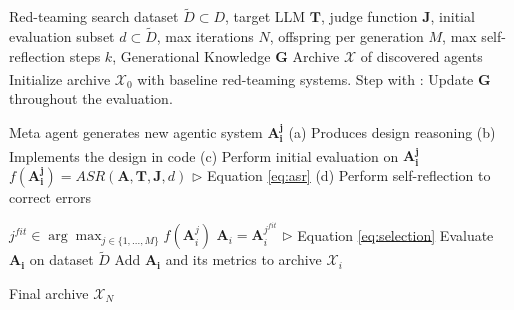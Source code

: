 \begin{algorithm}
\begin{algorithmic}[1]

     Red-teaming search dataset $\tilde D \subset D$, target LLM $\mathbf{T}$, judge function $\textbf{J}$, initial evaluation subset $d\subset \tilde D$, max iterations $N$, offspring per generation $M$, max self-reflection steps $k$, Generational Knowledge $\mathbf{G}$
     Archive $\mathcal{X}$ of discovered agents
    \STATE Initialize archive $\mathcal{X}_0$ with baseline red-teaming systems. Step with \textsuperscript{\textdaggerdbl}: Update $\mathbf{G}$ throughout the evaluation.

             Meta agent generates new agentic system $\mathbf{A_i^j}$
            \STATE \quad (a) Produces design reasoning
            \STATE \quad (b) Implements the design in code
                \STATE \quad (c) \textsuperscript{\textdaggerdbl} Perform initial evaluation on $\mathbf{A_i^j}$ 
                \STATE \quad $f(\mathbf{A_i^j}) = ASR(\mathbf A, \mathbf T , \mathbf J, d)$       \; \; \; $\triangleright$ Equation \ref{eq:asr}
                    \STATE \quad (d) Perform self-reflection to correct errors
                \ENDIF
            \ENDFOR
        \ENDFOR

        \STATE $j^{fit}\in \arg\max_{j\in\{1,...,M\}} f(\mathbf{A}_i^j)$
        \STATE $\mathbf{A}_i = \mathbf{A}_i^{j^{fit}}$ \; \; \; $\triangleright$ Equation \ref{eq:selection}
        \textsuperscript{\textdaggerdbl} Evaluate $\mathbf{A_i}$ on dataset $\tilde D$ 
         Add $\mathbf{A_i}$ and its metrics to archive $\mathcal{X}_{i}$
    \ENDFOR

     Final archive $\mathcal{X}_{N}$
\end{algorithmic}
\end{algorithm}



